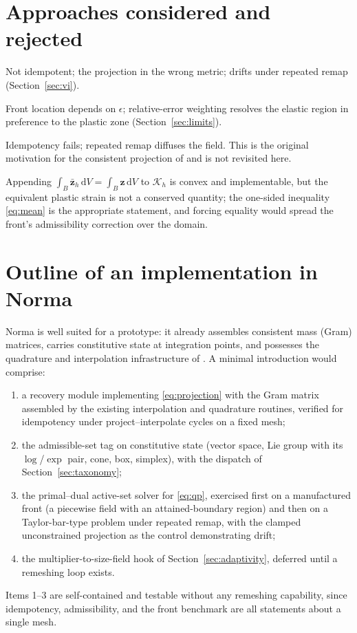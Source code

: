 \documentclass[11pt]{article}
\newcommand{\dd}{\mathrm{d}}
\newcommand{\bs}[1]{\boldsymbol{#1}}
\begin{document}
\section{Approaches considered and rejected}
\label{sec:rejected}

\begin{description}[nosep]
\item[Clamping after projection.] Not idempotent; the projection in the
wrong metric; drifts under repeated remap
(Section~\ref{sec:vi}).
\item[Regularized logarithm $\log(\epsilon + \varepsilon^p)$.] Front
location depends on $\epsilon$; relative-error weighting resolves the
elastic region in preference to the plastic zone
(Section~\ref{sec:limits}).
\item[Lumped projection.] Idempotency fails; repeated remap diffuses the
field. This is the original motivation for the consistent projection of
\cite{mota2013} and is not revisited here.
\item[Conservation constraint on the mean.] Appending
$\int_B \bar{\bs{z}}_h \,\dd V = \int_B \bs{z} \,\dd V$ to
$\mathcal{K}_h$ is convex and implementable, but the equivalent plastic
strain is not a conserved quantity; the one-sided inequality
\eqref{eq:mean} is the appropriate statement, and forcing equality
would spread the front's admissibility correction over the domain.
\end{description}

\section{Outline of an implementation in Norma}
\label{sec:norma}

Norma is well suited for a prototype: it already assembles consistent
mass (Gram) matrices, carries constitutive state at integration points,
and possesses the quadrature and interpolation infrastructure of
\cite{mota2013}. A minimal introduction would comprise:
\begin{enumerate}[nosep]
\item a recovery module implementing \eqref{eq:projection} with the Gram
matrix assembled by the existing interpolation and quadrature routines,
verified for idempotency under project--interpolate cycles on a fixed
mesh;
\item the admissible-set tag on constitutive state
(vector space, Lie group with its $\log$/$\exp$ pair, cone, box,
simplex), with the dispatch of Section~\ref{sec:taxonomy};
\item the primal--dual active-set solver for \eqref{eq:qp}, exercised
first on a manufactured front (a piecewise field with an attained-boundary
region) and then on a Taylor-bar-type problem under repeated remap, with
the clamped unconstrained projection as the control demonstrating drift;
\item the multiplier-to-size-field hook of
Section~\ref{sec:adaptivity}, deferred until a remeshing loop exists.
\end{enumerate}
Items 1--3 are self-contained and testable without any remeshing
capability, since idempotency, admissibility, and the front benchmark are
all statements about a single mesh.
\end{document}
